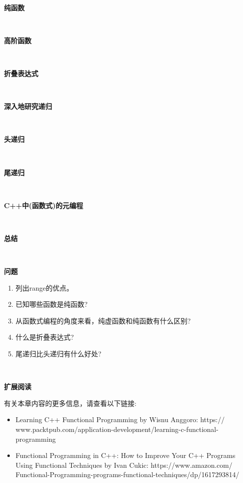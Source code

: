 \noindent\textbf{}\ \par
\textbf{纯函数} \ \par

\noindent\textbf{}\ \par
\textbf{高阶函数} \ \par

\noindent\textbf{}\ \par
\textbf{折叠表达式} \ \par

\noindent\textbf{}\ \par
\textbf{深入地研究递归} \ \par

\noindent\textbf{}\ \par
\textbf{头递归} \ \par

\noindent\textbf{}\ \par
\textbf{尾递归} \ \par

\noindent\textbf{}\ \par
\textbf{C++中(函数式)的元编程} \ \par

\noindent\textbf{}\ \par
\textbf{总结} \ \par

\noindent\textbf{}\ \par
\textbf{问题} \ \par
\begin{enumerate}
	\item 列出range的优点。
	\item 已知哪些函数是纯函数?
	\item 从函数式编程的角度来看，纯虚函数和纯函数有什么区别?
	\item 什么是折叠表达式?
	\item 尾递归比头递归有什么好处?
\end{enumerate}

\noindent\textbf{}\ \par
\textbf{扩展阅读} \ \par
有关本章内容的更多信息，请查看以下链接: \par

\begin{itemize}
	\item Learning C++ Functional Programming by Wisnu Anggoro:  https:/​/​www.packtpub.​com/​application-​development/​learning-​c-​functional-​programming
	\item Functional Programming in C++: How to Improve Your C++ Programs Using Functional Techniques by Ivan Cukic:  https:/​/​www.​amazon.​com/​Functional-Programming-​programs-​functional-​techniques/​dp/​1617293814/​
\end{itemize}

\newpage







